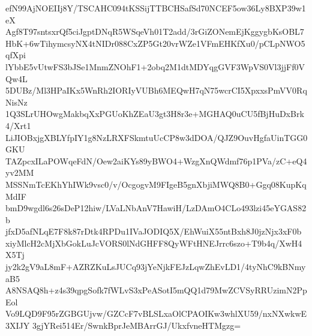 efN99AjNOEIIj8Y/TSCAHC094tKSSijTTBCHSafSd70NCEF5ow36Ly8BXP39w1eX
Agf8T97sntsxrQf5ciJgptDNqR5WSqeVh01T2add/3rGiZONemEjKggygbKsOBL7
HbK+6wTihymcsyNX4tNIDr088CxZP5Gt20vrWZe1VFmEHKfXu0/pCLpNWO5qfXpi
lYbbE5vUtwFS3bJSe1MnmZNOhF1+2obq2M1dtMDYqgGVF3WpVS0Vl3jjFf0VQw4L
5DUBz/Ml3HPaIKx5WnRh2IORIyVUBh6MEQwH7qN75wcrCI5XpxxsPmVV0RqNisNz
1Q3SLrUHOwgMakbqXxPGUoKhZEaU3gt3H8r3e+MGHAQ0uCU5fBjHuDxBrk4/Xrt1
LiJIOBxjgXBLYfpIY1g8NzLRXFSkmtuUcCP8w3dDOA/QJZ9OuvHgfaUinTGG0GKU
TAZpcxILaPOWqeFdN/Oew2aiKYs89yBWO4+WzgXnQWdmf76p1PVa/zC+eQ4yv2MM
MSSNmTcEKhYhIWk9vsc0/v/OcgogvM9FIgeB5gnXbjiMWQ8B0+Ggq08KupKqMdIF
bmD9wgdl6s26sDeP12hiw/LVaLNbAnV7HawiH/LzDAmO4CLo493lzi45eYGAS82b
jfxD5afNLqE7F8k87rDtk4RPDu1IVaJODIQ5X/EhWuiX55ntBxh8J0jzNjx3xF0b
xiyMlcH2cMjXbGokLuJcVORS0lNdGHFF8QyWFtHNEJrrc6szo+T9b4q/XwH4X5Tj
jy2k2gV9aL8mF+AZRZKuLsJUCq93jYeNjkFEJzLqwZhEvLD1/4tyNhC9kBNmyaB5
A8NSAQ8h+z4s39qpgSofk7fWLvS3xPeASotI5mQQ1d79MwZCVSyRRUzimN2PpEol
Vo9LQD9F95rZGBGUjvw/GZCcF7vBLSLxaOlCPAOIKw3whlXU59/nxNXwkwE3XIJY
3gjYRei514Er/SwnkBprJeMBArrGJ/UkxfvneHTMgzg=
